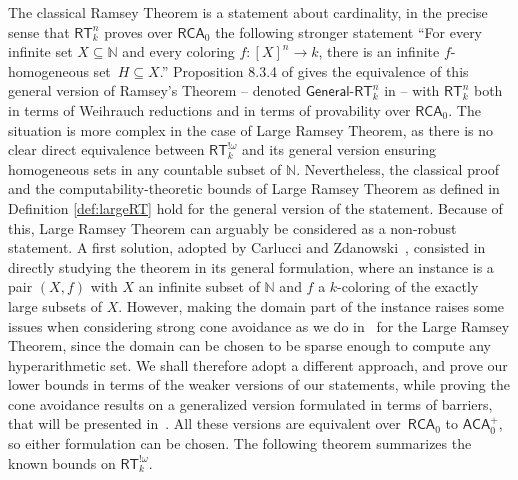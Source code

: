 \documentclass[10pt,a4paper]{article}
\newcommand{\RCA}[0]{\mathsf{RCA}}
\newcommand{\ACA}[0]{\mathsf{ACA}}
\newcommand{\RT}[0]{\mathsf{RT}}
\newcommand{\NN}[0]{\mathbb{N}}
\def\qt#1{``#1''}%
\numberwithin{theorem}{section}
\begin{document}
The classical Ramsey Theorem is a statement about cardinality, in the precise sense that $\RT^n_k$ proves over $\RCA_0$ the following stronger statement \qt{For every infinite set $X \subseteq \NN$ and every coloring $f : [X]^n \to k$, there is an infinite $f$-homogeneous set~$H \subseteq X$.} Proposition 8.3.4 of \cite{Dza-Mum:22} gives the equivalence of this general version of Ramsey's Theorem -- denoted $\mathsf{General}$-$\RT^n_k$ in \cite{Dza-Mum:22} -- with $\RT^n_k$ both in terms of Weihrauch reductions and in terms of provability over $\RCA_0$. The situation is more complex in the case of Large Ramsey Theorem, as there is no clear direct equivalence between $\RT^{!\omega}_k$ and its general version ensuring homogeneous sets in any countable subset of $\NN$.
Nevertheless, the classical proof and the computability-theoretic bounds of Large Ramsey Theorem as defined in Definition \ref{def:largeRT} hold for the general version of the statement. Because of this, Large Ramsey Theorem can arguably be considered as a non-robust statement. A first solution, adopted by Carlucci and Zdanowski~\cite{carlucci2014strength}, consisted in directly studying the theorem in its general formulation, where an instance is a pair $(X, f)$ with $X$ an infinite subset of $\NN$ and $f$ a $k$-coloring of the exactly large subsets of $X$. However, making the domain part of the instance raises some issues when considering strong cone avoidance as we do in~ for the Large Ramsey Theorem, since the domain can be chosen to be sparse enough to compute any hyperarithmetic set. We shall therefore adopt a different approach, and prove our lower bounds in terms of the weaker versions of our statements, while proving the cone avoidance results on a generalized version formulated in terms of barriers, that will be presented in~. All these versions are equivalent over~$\RCA_0$ to $\ACA_0^+$, so either formulation can be chosen.
The following theorem summarizes the known bounds on $\RT^{!\omega}_k$. 
\end{document}
